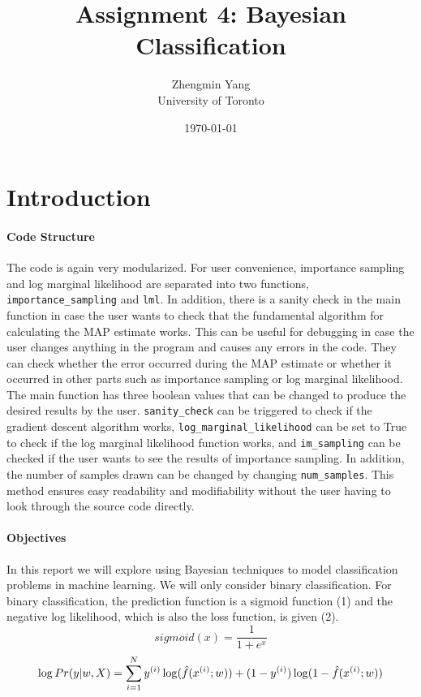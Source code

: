 \documentclass[11pt,letterpaper,titlepage]{article}
\title{Assignment 4: Bayesian Classification}
\author{Zhengmin Yang \\ University of Toronto}
\date{\today}
\begin{document}
	\maketitle
	
	\section{Introduction}
	\paragraph{Code Structure}
	The code is again very modularized. For user convenience, importance sampling and log marginal likelihood are separated into two functions, \texttt{importance\_sampling} and \texttt{lml}. In addition, there is a sanity check in the main function in case the user wants to check that the fundamental algorithm for calculating the MAP estimate works. This can be useful for debugging in case the user changes anything in the program and causes any errors in the code. They can check whether the error occurred during the MAP estimate or whether it occurred in other parts such as importance sampling or log marginal likelihood.\\
	The main function has three boolean values that can be changed to produce the desired results by the user. \texttt{sanity\_check} can be triggered to check if the gradient descent algorithm works, \texttt{log\_marginal\_likelihood} can be set to True to check if the log marginal likelihood function works, and \texttt{im\_sampling} can be checked if the user wants to see the results of importance sampling. In addition, the number of samples drawn can be changed by changing \texttt{num\_samples}.
	This method ensures easy readability and modifiability without the user having to look through the source code directly.
	
	\paragraph{Objectives}
	In this report we will explore using Bayesian techniques to model classification problems in machine learning. We will only consider binary classification. For binary classification, the prediction function is a sigmoid function (1) and the negative log likelihood, which is also the loss function, is given (2).
	\begin{equation}
	sigmoid(x)=\frac{1}{1+e^{x}}
	\end{equation}
	\begin{equation}
	\log Pr(\boldmath y \unboldmath | \boldmath w \unboldmath, \boldmath X \unboldmath)  = \sum_{i=1}^{N} y^{(i)}\log(\hat{f}(\boldmath x^{(i)}\unboldmath; \boldmath w \unboldmath)) + (1-y^{(i)})\log (1-\hat{f}(\boldmath x^{(i)} \unboldmath; \boldmath w \unboldmath))
	\end{equation}
	
\end{document}
